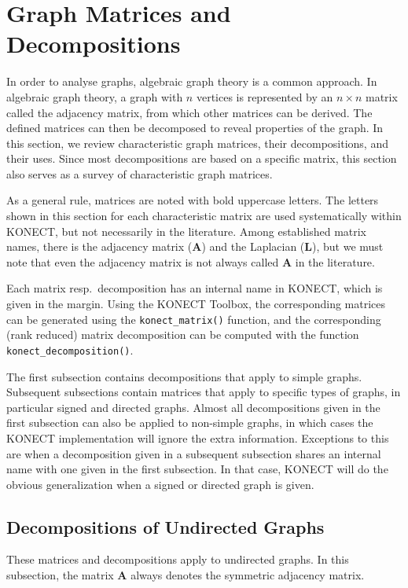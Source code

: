 \documentclass{article}
\begin{document}
\section{Graph Matrices and Decompositions}
\label{sec:matrix}
In order to analyse graphs, algebraic graph theory is a common
approach.  In algebraic graph theory, a graph with $n$ vertices is
represented by an $n\times n$ matrix called the adjacency matrix, from
which other matrices can be derived.  The defined matrices can then be
decomposed to reveal properties of the graph. 
In this section, we review characteristic graph matrices, their
decompositions, and their uses.  Since most decompositions are based on
a specific matrix, this section also serves as a survey of
characteristic graph matrices.  

As a general rule, matrices are noted with bold uppercase letters.  The
letters shown in this section for each characteristic matrix are used
systematically within KONECT, but not necessarily in the literature.
Among established matrix names, there is the adjacency matrix ($\mathbf
A$) and the Laplacian ($\mathbf L$), but we must note that even the
adjacency matrix is not always called $\mathbf A$ in the literature.

Each matrix resp.\ decomposition has an internal name in KONECT, which
is given in the margin.  Using the KONECT Toolbox, the corresponding
matrices can be generated using the \texttt{konect\_matrix()} function,
and the corresponding (rank reduced) matrix decomposition can be
computed with the function \texttt{konect\_decomposition()}. 

The first subsection contains decompositions that apply to simple
graphs.  Subsequent subsections contain matrices that apply to specific
types of graphs, in particular signed and directed graphs.  Almost all
decompositions given in the first subsection can also be applied to
non-simple graphs, in which cases the KONECT implementation will ignore
the extra information.  Exceptions to this are when a decomposition
given in a subsequent subsection shares an internal name with one given
in the first subsection.  In that case, KONECT will do the obvious
generalization when a signed or directed graph is given. 

\subsection{Decompositions of Undirected Graphs}
These matrices and decompositions apply to undirected graphs.  In this
subsection, the matrix $\mathbf A$ always denotes the symmetric
adjacency matrix. 
\end{document}
